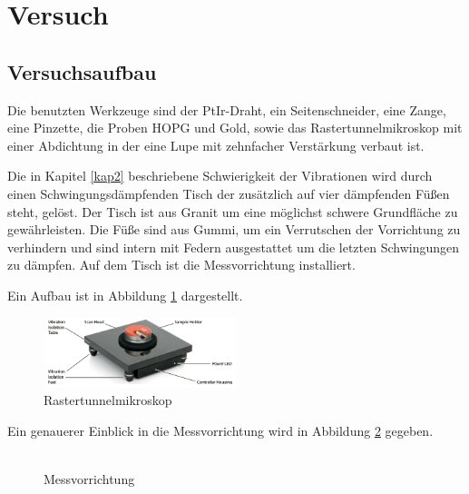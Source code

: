 \section{Versuch}
\subsection{Versuchsaufbau}
Die benutzten Werkzeuge sind der PtIr-Draht, ein Seitenschneider, eine Zange, eine Pinzette, die Proben HOPG und Gold, sowie das Rastertunnelmikroskop mit einer Abdichtung in der eine Lupe mit zehnfacher Verstärkung verbaut ist.

\noindent Die in Kapitel \ref{kap2} beschriebene Schwierigkeit der Vibrationen wird durch einen Schwingungsdämpfenden Tisch der zusätzlich auf vier dämpfenden Füßen steht, gelöst. Der Tisch ist aus Granit um eine möglichst schwere Grundfläche zu gewährleisten. Die Füße sind aus Gummi, um ein Verrutschen der Vorrichtung zu verhindern und sind intern mit Federn ausgestattet um die letzten Schwingungen zu dämpfen. Auf dem Tisch ist die Messvorrichtung installiert.

\noindent Ein Aufbau ist in Abbildung \ref{fig:Aufbau1} \cite{handbuch} dargestellt. 

\begin{figure}
	\centering
		\includegraphics[width=0.5\textwidth]{Aufbau1.png}
	\caption{Rastertunnelmikroskop}
	\label{fig:Aufbau1}
\end{figure}

\noindent Ein genauerer Einblick in die Messvorrichtung wird in Abbildung \ref{fig:Aufbau2} gegeben.

\begin{figure}
	\centering
		\includegraphics[width=0.5,scale=0.5\textwidth]{Aufbau2}
	\caption{Messvorrichtung}
	\label{fig:Aufbau2}
\end{figure}

